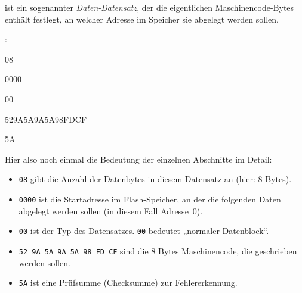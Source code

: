 \documentclass[a4paper,12pt]{article}
\begin{document}
ist ein sogenannter \emph{Daten-Datensatz}, der die eigentlichen
Maschinencode-Bytes enthält festlegt, an welcher Adresse im Speicher sie abgelegt
werden sollen.

\begin{center}
\begin{minipage}{\textwidth}
\ttfamily
\colorbox{gray!20}{\strut\textcolor{black}{:}}%
\colorbox{myblue!20}{\strut08}%
\colorbox{cyan!20}{\strut0000}%
\colorbox{violet!20}{\strut00}%
\colorbox{green!10}{\strut529A5A9A5A98FDCF}%
\colorbox{red!20}{\strut5A}

\vspace{0.2cm}

\hspace{1cm}%
\end{minipage}
\end{center}

\noindent
Hier also noch einmal die Bedeutung der einzelnen Abschnitte im Detail:
\begin{itemize}
    \item
	\texttt{08} gibt die Anzahl der Datenbytes in diesem Datensatz an
	(hier: 8 Bytes).
    \item
	\texttt{0000} ist die Startadresse im Flash-Speicher, an der die
	folgenden Daten abgelegt werden sollen (in diesem Fall Adresse~0).
    \item
	\texttt{00} ist der Typ des Datensatzes. \texttt{00} bedeutet „normaler
	Datenblock“.
    \item
	\texttt{52 9A 5A 9A 5A 98 FD CF} sind die 8 Bytes Maschinencode, die
	geschrieben werden sollen.
    \item
	\texttt{5A} ist eine Prüfsumme (Checksumme) zur Fehlererkennung.
\end{itemize}
\end{document}
